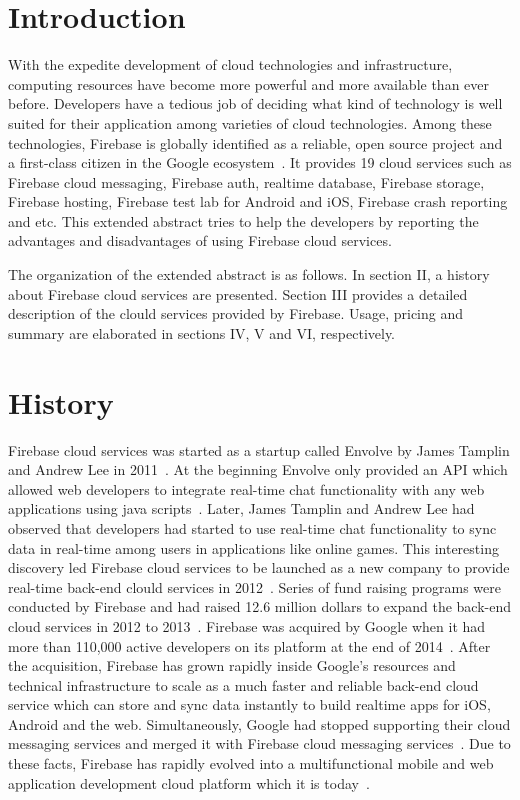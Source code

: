 \section{Introduction}

With the expedite development of cloud technologies and
infrastructure, computing resources have become more powerful and more
available than ever before.  Developers have a tedious job of deciding
what kind of technology is well suited for their application among
varieties of cloud technologies. Among these technologies, Firebase is
globally identified as a reliable, open source project and a
first-class citizen in the Google
ecosystem~\cite{hid-sp18-409-www-firebase}. It provides 19 cloud
services such as Firebase cloud messaging, Firebase auth, realtime
database, Firebase storage, Firebase hosting, Firebase test lab for
Android and iOS, Firebase crash reporting and etc. This extended
abstract tries to help the developers by reporting the advantages and
disadvantages of using Firebase cloud services.

The organization of the extended abstract is as follows. In section
II, a history about Firebase cloud services are presented. Section III
provides a detailed description of the clould services provided by
Firebase. Usage, pricing and summary are elaborated in sections IV, V
and VI, respectively.

\section{History}

Firebase cloud services was started as a startup called Envolve by
James Tamplin and Andrew Lee in
2011~\cite{hid-sp18-409-www-firebase-wikipedia}. At the beginning
Envolve only provided an API which allowed web developers to integrate
real-time chat functionality with any web applications using java
scripts~\cite{hid-sp18-409-www-firebase}. Later, James Tamplin and
Andrew Lee had observed that developers had started to use real-time
chat functionality to sync data in real-time among users in
applications like online games. This interesting discovery led
Firebase cloud services to be launched as a new company to provide
real-time back-end clould services in
2012~\cite{hid-sp18-409-www-firebase-wikipedia}. Series of fund
raising programs were conducted by Firebase and had raised 12.6
million dollars to expand the back-end cloud services in 2012 to
2013~\cite{hid-sp18-409-www-firebase}.  Firebase was acquired by
Google when it had more than 110,000 active developers on its platform
at the end of 2014~\cite{hid-sp18-409-www-firebase-acquired}.  After
the acquisition, Firebase has grown rapidly inside Google's resources
and technical infrastructure to scale as a much faster and reliable
back-end cloud service which can store and sync data instantly to
build realtime apps for iOS, Android and the web. Simultaneously,
Google had stopped supporting their cloud messaging services and
merged it with Firebase cloud messaging
services~\cite{hid-sp18-409-www-firebase-merged}. Due to these facts,
Firebase has rapidly evolved into a multifunctional mobile and web
application development cloud platform which it is
today~\cite{hid-sp18-409-www-firebase-official}.

